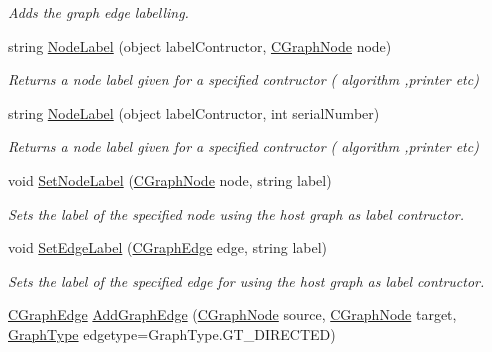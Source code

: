 \begin{DoxyCompactItemize}
\begin{DoxyCompactList}\small\item\em Adds the graph edge labelling. \end{DoxyCompactList}\item 
string \hyperlink{class_graph_library_1_1_c_graph_a84eb3418b6dca4fc1d8dea9d1864493d}{Node\+Label} (object label\+Contructor, \hyperlink{class_graph_library_1_1_c_graph_node}{C\+Graph\+Node} node)
\begin{DoxyCompactList}\small\item\em Returns a node label given for a specified contructor ( algorithm ,printer etc) \end{DoxyCompactList}\item 
string \hyperlink{class_graph_library_1_1_c_graph_a31064cccadfc56bb1d4bcb9a1605ad27}{Node\+Label} (object label\+Contructor, int serial\+Number)
\begin{DoxyCompactList}\small\item\em Returns a node label given for a specified contructor ( algorithm ,printer etc) \end{DoxyCompactList}\item 
void \hyperlink{class_graph_library_1_1_c_graph_a670c9a24d5244887e9c231707c7eef57}{Set\+Node\+Label} (\hyperlink{class_graph_library_1_1_c_graph_node}{C\+Graph\+Node} node, string label)
\begin{DoxyCompactList}\small\item\em Sets the label of the specified node using the host graph as label contructor. \end{DoxyCompactList}\item 
void \hyperlink{class_graph_library_1_1_c_graph_a3ef7f744ad2a374e1fa7eeded40325e4}{Set\+Edge\+Label} (\hyperlink{class_graph_library_1_1_c_graph_edge}{C\+Graph\+Edge} edge, string label)
\begin{DoxyCompactList}\small\item\em Sets the label of the specified edge for using the host graph as label contructor. \end{DoxyCompactList}\item 
\hyperlink{class_graph_library_1_1_c_graph_edge}{C\+Graph\+Edge} \hyperlink{class_graph_library_1_1_c_graph_af12db1b8e252d2a1e3179d12180798dc}{Add\+Graph\+Edge} (\hyperlink{class_graph_library_1_1_c_graph_node}{C\+Graph\+Node} source, \hyperlink{class_graph_library_1_1_c_graph_node}{C\+Graph\+Node} target, \hyperlink{namespace_graph_library_1_1_generics_a1bac729ea88e6f3925406df33f15d056}{Graph\+Type} edgetype=Graph\+Type.\+G\+T\+\_\+\+D\+I\+R\+E\+C\+T\+E\+D)

\end{DoxyCompactItemize}

